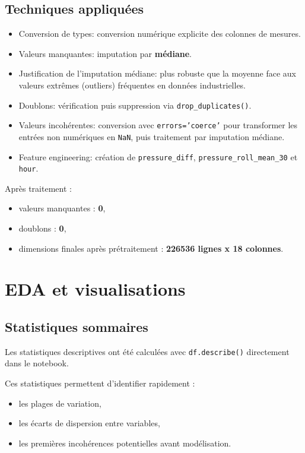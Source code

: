 \documentclass[11pt,a4paper]{article}
\begin{document}
\subsection{Techniques appliquées}
\begin{itemize}
  \item Conversion de types: conversion numérique explicite des colonnes de mesures.
  \item Valeurs manquantes: imputation par \textbf{médiane}.
  \item Justification de l'imputation médiane: plus robuste que la moyenne face aux valeurs extrêmes (outliers) fréquentes en données industrielles.
  \item Doublons: vérification puis suppression via \texttt{drop\_duplicates()}.
  \item Valeurs incohérentes: conversion avec \texttt{errors='coerce'} pour transformer les entrées non numériques en \texttt{NaN}, puis traitement par imputation médiane.
  \item Feature engineering: création de \texttt{pressure\_diff}, \texttt{pressure\_roll\_mean\_30} et \texttt{hour}.
\end{itemize}

Après traitement :
\begin{itemize}
  \item valeurs manquantes : \textbf{0},
  \item doublons : \textbf{0},
  \item dimensions finales après prétraitement : \textbf{226536 lignes x 18 colonnes}.
\end{itemize}

\section{EDA et visualisations}
\subsection{Statistiques sommaires}
Les statistiques descriptives ont été calculées avec \texttt{df.describe()} directement dans le notebook.

Ces statistiques permettent d'identifier rapidement :
\begin{itemize}
  \item les plages de variation,
  \item les écarts de dispersion entre variables,
  \item les premières incohérences potentielles avant modélisation.
\end{itemize}
\end{document}

